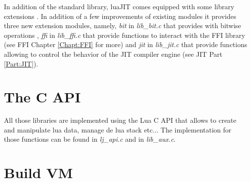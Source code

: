 In addition of the standard library, luaJIT comes equipped with some library
extensions \cite{extensions}. In addition of a few improvements of existing
modules it provides three new extension modules, namely, \emph{bit} in
\emph{lib\_bit.c} that provides with bitwise operations \cite{bitOp}, \emph{ffi}
in \emph{lib\_ffi.c} that provide functions to interact with the FFI library
(see FFI Chapter \ref{Chapt:FFI} for more) and \emph{jit} in \emph{lib\_jit.c}
that provide functions allowing to control the behavior of the JIT compiler
engine (see JIT Part \ref{Part:JIT}).

\section{The C API}
\label{Sec:c-api}

All those libraries are implemented using the Lua C API that allows to create
and manipulate lua data, manage de lua stack etc... The implementation for those
functions can be found in \emph{lj\_api.c} and in \emph{lib\_aux.c}.

\section{Build VM}
\label{Sec:c-api}

